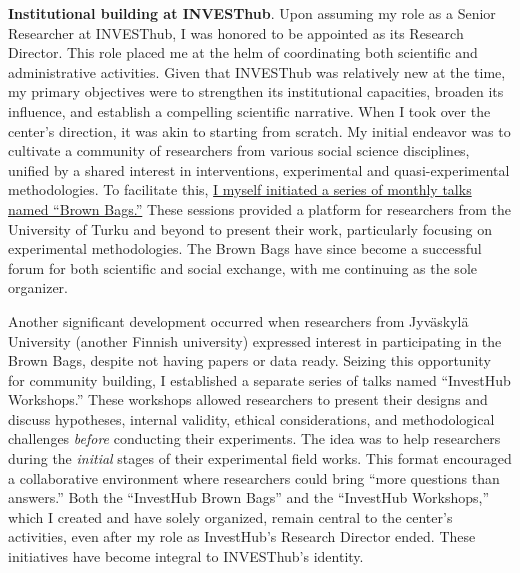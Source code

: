 \documentclass[10pt,stdletter,dateno,sigleft]{newlfm} %
\begin{document}
\begin{newlfm}
{\bf Institutional building at INVESThub}. Upon assuming my role as a Senior Researcher at INVESThub, I was honored to be appointed as its Research Director. This role placed me at the helm of coordinating both scientific and administrative activities. Given that INVESThub was relatively new at the time, my primary objectives were to strengthen its institutional capacities, broaden its influence, and establish a compelling scientific narrative. When I took over the center's direction, it was akin to starting from scratch. My initial endeavor was to cultivate a community of researchers from various social science disciplines, unified by a shared interest in interventions, experimental and quasi-experimental methodologies. To facilitate this, \href{https://invest.utu.fi/news/investhub-brings-together-social-scientists-interested-in-experimental-research/}{I myself initiated a series of monthly talks named ``Brown Bags.''} These sessions provided a platform for researchers from the University of Turku and beyond to present their work, particularly focusing on experimental methodologies. The Brown Bags have since become a successful forum for both scientific and social exchange, with me continuing as the sole organizer. 

Another significant development occurred when researchers from Jyväskylä University (another Finnish university) expressed interest in participating in the Brown Bags, despite not having papers or data ready. Seizing this opportunity for community building, I established a separate series of talks named ``InvestHub Workshops.'' These workshops allowed researchers to present their designs and discuss hypotheses, internal validity, ethical considerations, and methodological challenges \emph{before} conducting their experiments. The idea was to help researchers during the \emph{initial} stages of their experimental field works. This format encouraged a collaborative environment where researchers could bring ``more questions than answers.'' Both the ``InvestHub Brown Bags'' and the ``InvestHub Workshops,'' which I created and have solely organized, remain central to the center's activities, even after my role as InvestHub's Research Director ended. These initiatives have become integral to INVESThub's identity.


\end{newlfm}
\end{document}
